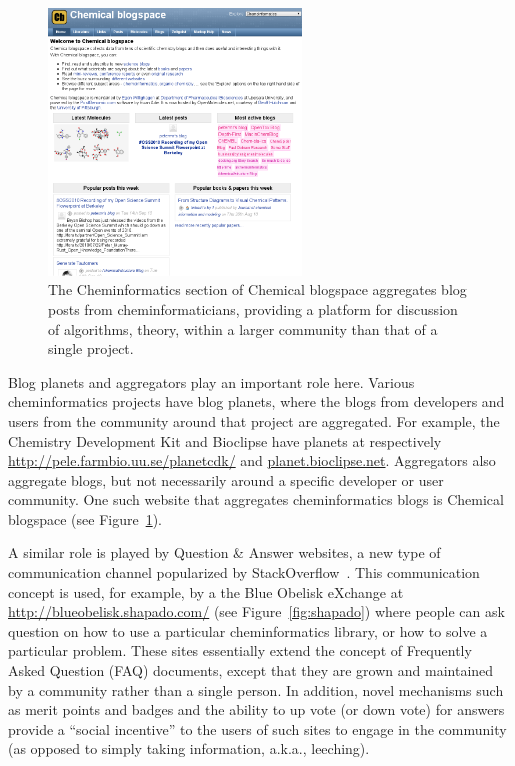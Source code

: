 \documentclass[11pt]{book}
\begin{document}
\begin{figure}[bt]
\begin{center}
\includegraphics[width=0.6\textwidth]{graphics/cb.png}
\end{center}
\caption{The Cheminformatics section of Chemical blogspace
aggregates blog posts from cheminformaticians, providing
a platform for discussion of algorithms, theory, within
a larger community than that of a single project.}
\label{fig:cb}
\end{figure}

Blog planets and aggregators play an important role here.
Various cheminformatics projects have blog planets, where
the blogs from developers and users from the community
around that project are aggregated. For example, the
Chemistry Development Kit and Bioclipse have planets
at respectively \url{http://pele.farmbio.uu.se/planetcdk/} and
\url{planet.bioclipse.net}.
Aggregators also aggregate blogs, but not necessarily around
a specific developer or user community. One such website
that aggregates cheminformatics blogs is Chemical blogspace
(see Figure~\ref{fig:cb}).

A similar role is played by Question \& Answer websites, a new
type of communication channel popularized by
StackOverflow~\cite{url:stackoverflow}. This communication
concept is used, for example, by a the Blue Obelisk
eXchange at \url{http://blueobelisk.shapado.com/}
(see Figure~\ref{fig:shapado}) where
people can ask question on how to use a particular
cheminformatics library, or how to solve a particular
problem. These sites essentially extend the concept of Frequently
Asked Question (FAQ) documents, except that they are grown and
maintained by a community rather than a single person. In addition,
novel mechanisms such as merit points and badges and the ability to
up vote (or down vote) for answers provide a ``social incentive'' to
the users of such sites to engage in the community (as opposed to
simply taking information, a.k.a., leeching).
\end{document}

